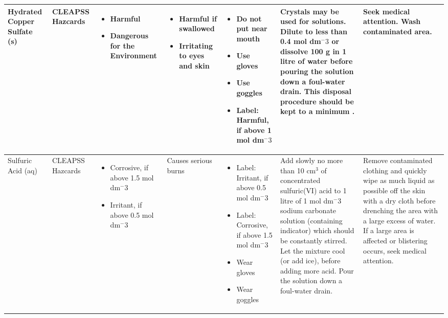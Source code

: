 \begin{landscape}
\begin{center}
\begin{longtable}{|p{1.5cm}|p{1.5cm}|p{3cm}|p{3cm}|p{3cm}|p{3cm}|p{2cm}|}
Hydrated Copper Sulfate (s) &
CLEAPSS Hazcards &
\begin{itemize}
\item Harmful
\item Dangerous for the Environment \end{itemize} &
\begin{itemize}
\item Harmful if swallowed
\item Irritating to eyes and skin \end{itemize} &
\begin{itemize}
\item Do not put near mouth
\item Use gloves
\item Use goggles
\item Label: Harmful, if above 1 mol dm$^-3$ \end{itemize} &
Crystals may be used for solutions. Dilute to less than 0.4 mol dm$^-3$ or dissolve 100 g in 1 litre of water before pouring the solution down a foul-water drain. This disposal procedure should be kept to a minimum . &
Seek medical attention. Wash contaminated area. \\ \hline



Sulfuric Acid (aq) &
CLEAPSS Hazcards &
\begin{itemize}
\item Corrosive, if above 1.5 mol dm$^-3$
\item Irritant, if above 0.5 mol dm$^-3$ \end{itemize} &
Causes serious burns & 
\begin{itemize}
\item Label: Irritant, if above 0.5 mol dm$^-3$
\item Label: Corrosive, if above 1.5 mol dm$^-3$
\item Wear gloves
\item Wear goggles \end{itemize} &
Add slowly no more than 10 cm$^3$ of concentrated sulfuric(VI) acid to 1 litre of 1 mol dm$^-3$ sodium carbonate solution (containing indicator) which should be constantly stirred. Let the mixture cool (or add ice), before adding more acid. Pour the solution down a foul-water drain. & 
Remove contaminated clothing and quickly wipe as much liquid as possible off the skin with a dry cloth before drenching the area with a large excess of water. If a large area is affected or blistering occurs, seek medical attention. \\ \hline


\end{longtable}
\end{center}
\end{landscape}
